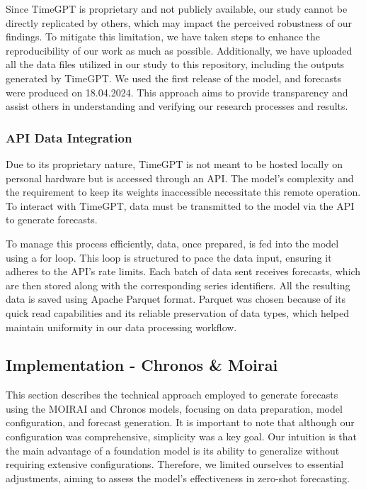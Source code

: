 \documentclass[12pt,a4paper]{article}
\begin{document}
Since TimeGPT is proprietary and not publicly available, our study cannot be directly replicated by others, which may impact the perceived robustness of our findings. To mitigate this limitation, we have taken steps to enhance the reproducibility of our work as much as possible. Additionally, we have uploaded all the data files utilized in our study to this repository, including the outputs generated by TimeGPT. We used the first release of the model, and forecasts were produced on 18.04.2024. This approach aims to provide transparency and assist others in understanding and verifying our research processes and results.

\subsubsection{API Data Integration}

Due to its proprietary nature, TimeGPT is not meant to be hosted locally on personal hardware but is accessed through an API. The model's complexity and the requirement to keep its weights inaccessible necessitate this remote operation. To interact with TimeGPT, data must be transmitted to the model via the API to generate forecasts.

To manage this process efficiently, data, once prepared, is fed into the model using a for loop. This loop is structured to pace the data input, ensuring it adheres to the API's rate limits. Each batch of data sent receives forecasts, which are then stored along with the corresponding series identifiers. All the resulting data is saved using Apache Parquet format. Parquet was chosen because of its quick read capabilities and its reliable preservation of data types, which helped maintain uniformity in our data processing workflow.

\subsection{Implementation - Chronos \& Moirai}

This section describes the technical approach employed to generate forecasts using the MOIRAI and Chronos models, focusing on data preparation, model configuration, and forecast generation. It is important to note that although our configuration was comprehensive, simplicity was a key goal. Our intuition is that the main advantage of a foundation model is its ability to generalize without requiring extensive configurations. Therefore, we limited ourselves to essential adjustments, aiming to assess the model’s effectiveness in zero-shot forecasting. 
\end{document}
